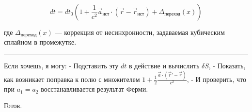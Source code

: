 \documentclass[11pt]{article}
\makeatletter
\newcommand{\boxspacing}{\kern\kvtcb@left@rule\kern\kvtcb@boxsep}
\newcommand{\prompt}[4]{
        {\ttfamily\llap{{\color{#2}[#3]:\hspace{3pt}#4}}\vspace{-\baselineskip}}
    }
\makeatother
\begin{document}
\[
dt = dt_0 \left( 1 + \frac{1}{c^2} \vec{a}_{\text{ист}} \cdot (\vec{r} - \vec{r}_{\text{ист}}) + \Delta_{\text{переход}}(x) \right)
\]

где \(\Delta_{\text{переход}}(x)\) --- коррекция от несинхронности,
задаваемая кубическим сплайном в промежутке.

\begin{center}\rule{0.5\linewidth}{\linethickness}\end{center}

Если хочешь, я могу: - Подставить эту \(dt\) в действие и вычислить
\(\delta S\), - Показать, как возникает поправка к полю с множителем
\(1 + \frac{1}{2} \frac{\vec{a} \cdot (\vec{r}' - \vec{r})}{c^2}\), - И
проверить, что при \(a_1 = a_2\) восстанавливается результат Ферми.

Готов.

    \begin{tcolorbox}[breakable, size=fbox, boxrule=1pt, pad at break*=1mm,colback=cellbackground, colframe=cellborder]
\prompt{In}{incolor}{ }{\boxspacing}
\begin{Verbatim}[commandchars=\\\{\}]

\end{Verbatim}
\end{tcolorbox}


\end{document}

